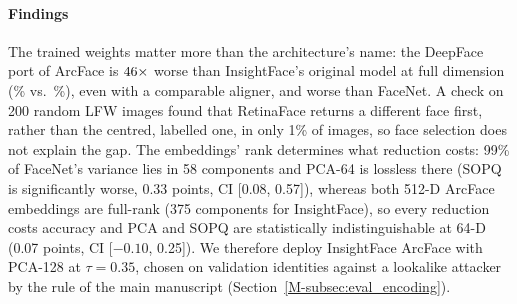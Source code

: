 \documentclass[10pt,letterpaper,journal]{IEEEtran}
\begin{document}
\begin{table}[h]
\centering
\caption{LFW EER (\%) with 95\% Pair-Bootstrap CIs, Same Pairs for All Rows}
\label{tab:supp-face-models}
\setlength{\tabcolsep}{3pt}
\end{table}

\paragraph{Findings} The trained weights matter more than the architecture's name: the DeepFace port of ArcFace is $46\times$ worse than InsightFace's original model at full dimension (\nDeepfaceEer\% vs.\ \nRawEer\%), even with a comparable aligner, and worse than FaceNet. A check on 200 random LFW images found that RetinaFace returns a different face first, rather than the centred, labelled one, in only 1\% of images, so face selection does not explain the gap. The embeddings' rank determines what reduction costs: 99\% of FaceNet's variance lies in 58 components and PCA-64 is lossless there (SOPQ is significantly worse, 0.33 points, CI [0.08, 0.57]), whereas both 512-D ArcFace embeddings are full-rank (375 components for InsightFace), so every reduction costs accuracy and PCA and SOPQ are statistically indistinguishable at 64-D (0.07 points, CI [$-0.10$, 0.25]). We therefore deploy InsightFace ArcFace with PCA-128 at $\tau = 0.35$, chosen on validation identities against a lookalike attacker by the rule of the main manuscript (Section~\ref{M-subsec:eval_encoding}).
\end{document}
